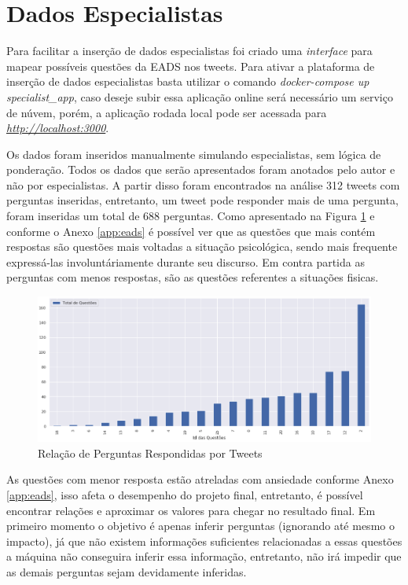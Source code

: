 \section{Dados Especialistas}
Para facilitar a inserção de dados especialistas foi criado uma \textit{interface} para mapear possíveis questões da EADS nos tweets. Para ativar a plataforma de inserção de dados especialistas basta utilizar o comando \textit{docker-compose up specialist\_app}, caso deseje subir essa aplicação online será necessário um serviço de núvem, porém, a aplicação rodada local pode ser acessada para \textit{\url{http://localhost:3000}}.

Os dados foram inseridos manualmente simulando especialistas, sem lógica de ponderação. Todos os dados que serão apresentados foram anotados pelo autor e não por especialistas. A partir disso foram encontrados na análise 312 tweets com perguntas inseridas, entretanto, um tweet pode responder mais de uma pergunta, foram inseridas um total de 688 perguntas. Como apresentado na Figura \ref{fig:question-balance} e conforme o Anexo \ref{app:eads} é possível ver que as questões que mais contém respostas são questões mais voltadas a situação psicológica, sendo mais frequente expressá-las involuntáriamente durante seu discurso. Em contra partida as perguntas com menos respostas, são as questões referentes a situações fisicas.

\begin{figure}[!ht]
    \centering
    \includegraphics[width=.75\textwidth]{imagens/question-balance.png}
    \caption{Relação de Perguntas Respondidas por Tweets}
    \label{fig:question-balance}
\end{figure}

As questões com menor resposta estão atreladas com ansiedade conforme Anexo \ref{app:eads}, isso afeta o desempenho do projeto final, entretanto, é possível encontrar relações e aproximar os valores para chegar no resultado final. Em primeiro momento o objetivo é apenas inferir perguntas (ignorando até mesmo o impacto), já que não existem informações suficientes relacionadas a essas questões a máquina não conseguira inferir essa informação, entretanto, não irá impedir que as demais perguntas sejam devidamente inferidas.

